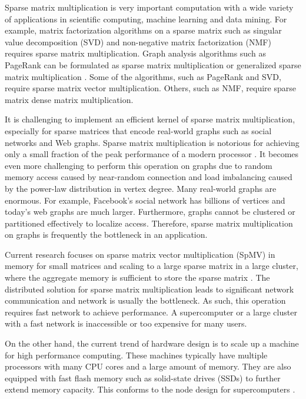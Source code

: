 Sparse matrix multiplication is very important computation with a wide variety
of applications in scientific computing, machine learning and data mining.
For example, matrix factorization algorithms on a sparse matrix such as
singular value decomposition (SVD) \cite{svd} and non-negative matrix
factorization (NMF) \cite{nmf} requires sparse matrix multiplication.
Graph analysis algorithms such as PageRank \cite{pagerank} can be
formulated as sparse matrix multiplication or generalized sparse matrix
multiplication \cite{Mattson13}. Some of
the algorithms, such as PageRank and SVD, require sparse matrix vector
multiplication. Others, such as NMF, require sparse matrix dense
matrix multiplication.


It is challenging to implement an efficient kernel of sparse matrix
multiplication, especially for sparse matrices that encode real-world graphs
such as social networks
and Web graphs. Sparse matrix multiplication is notorious for achieving only
a small fraction of the peak performance of a modern processor \cite{Williams07}.
It becomes even more challenging to perform this operation on graphs due to
random memory access caused by near-random connection and load imbalancing
caused by the power-law distribution in vertex degree. Many real-world graphs
are enormous. For example, Facebook's social network has billions of vertices
and today's web graphs are much larger. Furthermore, graphs cannot be
clustered or partitioned effectively \cite{leskovec} to localize access.
Therefore, sparse matrix multiplication on graphs is frequently the bottleneck
in an application.

Current research focuses on sparse matrix vector multiplication (SpMV) in memory
for small matrices and scaling to a large sparse matrix in a large cluster,
where the aggregate memory is sufficient to store the sparse matrix
\cite{Williams07, Yoo11, Boman2013}.
The distributed solution for sparse matrix multiplication leads to significant
network communication and network is usually the bottleneck.
As such, this operation requires fast network to achieve performance.
A supercomputer or a large cluster with a fast network is inaccessible or
too expensive for many users.


On the other hand, the current trend of hardware design is to scale up
a machine for high performance computing.
These machines typically have multiple processors with many CPU cores and
a large amount of memory. They are also equipped with fast flash
memory such as solid-state drives (SSDs) to further extend memory capacity.
This conforms to the node design for supercomputers \cite{Ang14}.

